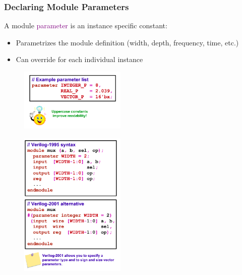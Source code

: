 \documentclass[t, notes, xcolor=table]{beamer}
\begin{document}
\begin{frame}
\frametitle{Declaring Module Parameters}
\begin{multicols}{2}

A module \textcolor{purple}{parameter} is an instance specific constant:
\footnotesize{
\begin{itemize}
\item Parametrizes the module definition (width, depth, frequency, time, etc.)
\item Can override for each individual instance 
\end{itemize}
}
\vfill
\begin{figure}
    \includegraphics[width=0.45\textwidth]{img/04_param0.png}
\end{figure}
\columnbreak

\begin{figure}
    \includegraphics[width=0.45\textwidth]{img/04_param1.png}
\end{figure}

\end{multicols}
\end{frame}
\end{document}

